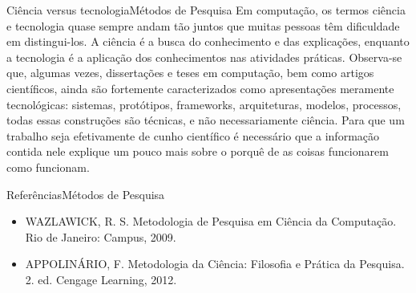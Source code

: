 \documentclass[t]{beamer}
\begin{document}

\begin{ftst}{Ciência versus tecnologia}{Métodos de Pesquisa}
\vone
\footnotesize
\justifying
Em computação, os termos ciência e tecnologia quase sempre andam tão juntos que muitas pessoas têm dificuldade em distingui-los. 
\vone
A ciência é a busca do conhecimento e das explicações, enquanto a tecnologia é a aplicação dos conhecimentos nas atividades práticas.
\vone
Observa-se que, algumas vezes, dissertações e teses em computação, bem como artigos científicos, ainda são fortemente caracterizados como apresentações meramente tecnológicas: sistemas, protótipos, frameworks, arquiteturas, modelos, processos, todas essas construções são técnicas, e não necessariamente
ciência.
\vone
Para que um trabalho seja efetivamente de cunho científico é necessário que a informação contida nele explique um pouco mais sobre o porquê de as coisas funcionarem como funcionam. 


\end{ftst}



\begin{ftst}{Referências}{Métodos de Pesquisa}
\vone
\begin{itemize}
    \item WAZLAWICK, R. S. Metodologia de Pesquisa em Ciência da Computação. Rio de Janeiro: Campus, 2009.
    \item APPOLINÁRIO, F. Metodologia da Ciência: Filosofia e Prática da Pesquisa. 2. ed. Cengage Learning, 2012.
\end{itemize} 


\end{ftst}

\end{document}
